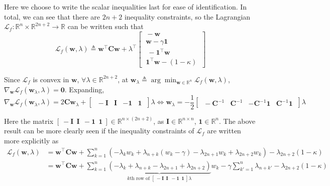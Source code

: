 \documentclass{article}
\numberwithin{equation}{section}
\begin{document}
Here we choose to write the scalar inequalities last for ease of
identification. In total, we can see that there are $ 2n + 2 $ inequality
constraints, so the Lagrangian $ \mathcal{L}_f : \mathbb{R}^n \times
\mathbb{R}^{2n + 2} \rightarrow \mathbb{R} $ can be written such that
\begin{equation*}
    \mathcal{L}_f(\mathbf{w}, \lambda) \triangleq \mathbf{w}^\top\mathbf{Cw} +
        \lambda^\top\begin{bmatrix}
            \ -\mathbf{w} \ \\
            \ \mathbf{w} - \gamma\mathbf{1} \\ \
            \ -\mathbf{1}^\top\mathbf{w} \ \\
            \ \mathbf{1}^\top\mathbf{w} - (1 - \kappa) \
        \end{bmatrix}
\end{equation*}

Since $ \mathcal{L}_f $ is convex in $ \mathbf{w} $, $ \forall \lambda \in
\mathbb{R}^{2n + 2} $, at $ \mathbf{w}_\lambda \triangleq
\arg\min_{\mathbf{w} \in\mathbb{R}^n}\mathcal{L}_f(\mathbf{w}, \lambda) $,
$ \nabla_\mathbf{w}\mathcal{L}_f(\mathbf{w}_\lambda, \lambda) = \mathbf{0} $. Expanding,
\begin{equation} \label{p2.3_wlambda}
    \nabla_\mathbf{w}\mathcal{L}_f(\mathbf{w}_\lambda, \lambda) =
    2\mathbf{Cw}_\lambda + \begin{bmatrix}
        \ -\mathbf{I} & \mathbf{I} & -\mathbf{1} & \mathbf{1} \
    \end{bmatrix}\lambda \Leftrightarrow
    \mathbf{w}_\lambda = -\frac{1}{2}\begin{bmatrix}
        \ -\mathbf{C}^{-1} & \mathbf{C}^{-1} & -\mathbf{C}^{-1}\mathbf{1} &
        \mathbf{C}^{-1}\mathbf{1} \
    \end{bmatrix}\lambda
\end{equation}

Here the matrix $ [ \ -\mathbf{I} \ \ \mathbf{I} \ \ -\mathbf{1} \ \
\mathbf{1} \ ] \in \mathbb{R}^{n \times (2n + 2)} $, as $ \mathbf{I} \in
\mathbb{R}^{n \times n} $, $ \mathbf{1} \in \mathbb{R}^n $. The above result
can be more clearly seen if the inequality constraints of $ \mathcal{L}_f $
are written more explicitly as
\begin{equation*}
    \begin{split}
    \mathcal{L}_f(\mathbf{w}, \lambda) & = \mathbf{w}^\top\mathbf{Cw} +
    \sum_{k = 1}^n(
        -\lambda_kw_k + \lambda_{n + k}(w_k - \gamma) - \lambda_{2n + 1}w_k +
        \lambda_{2n + 2}w_k
    ) - \lambda_{2n + 2}(1 - \kappa) \\ & =
    \mathbf{w}^\top\mathbf{Cw} + \sum_{k = 1}^n\underbrace{
        (-\lambda_k + \lambda_{n + k} - \lambda_{2n + 1} + \lambda_{2n + 2})
    }_{
        k\text{th row of } [
            \ -\mathbf{I} \ \ \mathbf{I} \ \ -\mathbf{1} \ \ \mathbf{1} \
        ]\lambda
    }w_k - \gamma\sum_{k' = 1}^n\lambda_{n + k'} - \lambda_{2n + 2}(1 - \kappa)
    \end{split}
\end{equation*}
\end{document}
